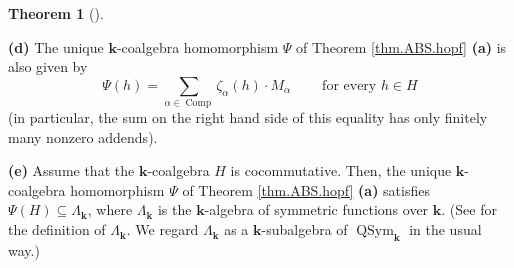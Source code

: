 \documentclass[numbers=enddot,12pt,final,onecolumn,notitlepage,abstracton]{scrartcl}%
\theoremstyle{definition}
\newtheorem{theo}{Theorem}[section]
\newenvironment{theorem}[1][]
{\begin{theo}[#1]\begin{leftbar}}
{\end{leftbar}\end{theo}}
\let\sumnonlimits\sum
\renewcommand{\sum}{\sumnonlimits\limits}
\begin{document}
\begin{theorem}
\textbf{(d)} The unique $\mathbf{k}$-coalgebra homomorphism $\Psi$ of Theorem
\ref{thm.ABS.hopf} \textbf{(a)} is also given by%
\[
\Psi\left(  h\right)  =\sum_{\alpha\in\operatorname*{Comp}}\zeta_{\alpha
}\left(  h\right)  \cdot M_{\alpha}\ \ \ \ \ \ \ \ \ \ \text{for every }h\in
H
\]
(in particular, the sum on the right hand side of this equality has only
finitely many nonzero addends).

\textbf{(e)} Assume that the $\mathbf{k}$-coalgebra $H$ is cocommutative.
Then, the unique $\mathbf{k}$-coalgebra homomorphism $\Psi$ of Theorem
\ref{thm.ABS.hopf} \textbf{(a)} satisfies $\Psi\left(  H\right)
\subseteq\Lambda_{\mathbf{k}}$, where $\Lambda_{\mathbf{k}}$ is the
$\mathbf{k}$-algebra of symmetric functions over $\mathbf{k}$. (See
\cite[\S 2]{Reiner} for the definition of $\Lambda_{\mathbf{k}}$. We regard
$\Lambda_{\mathbf{k}}$ as a $\mathbf{k}$-subalgebra of $\operatorname*{QSym}%
\nolimits_{\mathbf{k}}$ in the usual way.)
\end{theorem}
\end{document}
